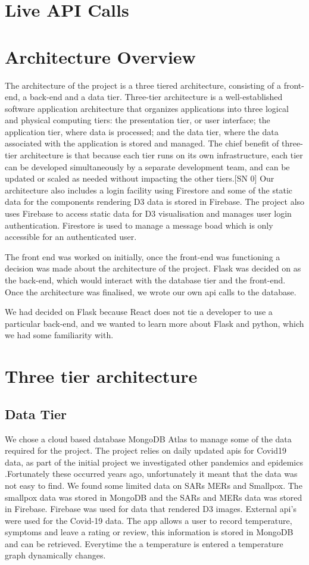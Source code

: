 \section{Live API Calls}


\section{Architecture Overview}
The architecture of the project is a three tiered architecture, consisting of a front-end, a back-end and a data tier.
Three-tier architecture is a well-established software application architecture that organizes applications into three logical and physical computing tiers: the presentation tier, or user interface; the application tier, where data is processed; and the data tier, where the data associated with the application is stored and managed.
The chief benefit of three-tier architecture is that because each tier runs on its own infrastructure, each tier can be developed simultaneously by a separate development team, and can be updated or scaled as needed without impacting the other tiers.[SN 0]
Our architecture also includes a login facility using Firestore and some of the static data for the components rendering D3 data is stored in Firebase.
The project also uses Firebase to access static data for D3 visualisation and manages user login authentication. Firestore is used to manage a message boad which is only accessible for an authenticated user.


The front end was worked on initially, once the front-end was functioning a decision was made about the architecture of the project. Flask was decided on as the back-end, which would interact with the database tier and the front-end.
Once the architecture was finalised, we wrote our own api calls to the database.
 
We had decided on Flask because React does not tie a developer to use a particular back-end, and we wanted to learn more about Flask and python, which we had some familiarity with.



\section{Three tier architecture}
\subsection{Data Tier}
We chose a cloud based database MongoDB Atlas to manage some of the data required for the project. The project relies on daily updated apis for Covid19 data, as part of the initial project we investigated other pandemics and epidemics .Fortunately these occurred years ago, unfortunately it meant that the data was not easy to find. We found some limited data on SARs MERs and Smallpox. The smallpox data was stored in MongoDB and the SARs and MERs data was stored in Firebase.
Firebase was used for data that rendered D3 images. External api's were used for the Covid-19 data. The app allows a user to record temperature, symptoms and leave a rating or review, this information is stored in MongoDB and can be retrieved. Everytime the a temperature is entered a temperature graph dynamically changes.

